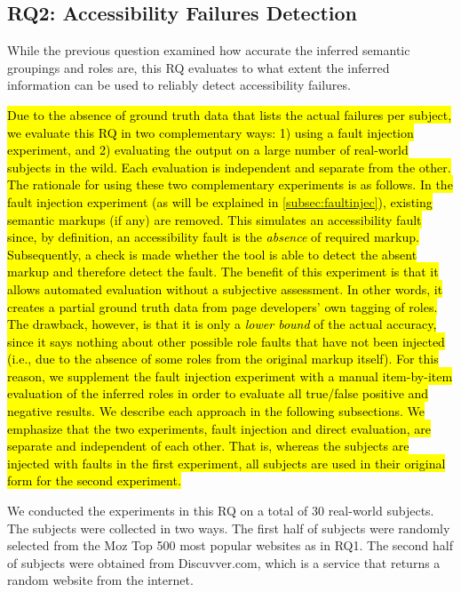 \subsection{RQ2: Accessibility Failures Detection}
While the previous question examined how accurate 
the inferred semantic groupings and roles are, 
this RQ evaluates to what extent the inferred information 
can be used to reliably detect accessibility failures.

\hl{Due to the absence of ground truth data that lists the 
actual failures per subject, 
we evaluate this RQ in two complementary ways: 
1) using a fault injection experiment, 
and 2) evaluating the output on a large number 
of real-world subjects in the wild. 
Each evaluation is independent and separate from the other. 
The rationale for using these two complementary experiments is as follows. 
In the fault injection experiment (as will be explained in \mbox{\cref{subsec:faultinjec}}), 
existing semantic markups (if any) 
are removed. This simulates an accessibility fault since, by definition, 
an accessibility fault is the \emph{absence} of required markup. 
Subsequently, a check is made whether the tool is able to detect the absent markup 
and therefore detect the fault. 
The benefit of this experiment is that it allows automated evaluation 
without a subjective assessment. In other words, it creates a partial 
ground truth data from page developers' own tagging of roles. 
The drawback, however, is that it is only a \emph{lower bound} 
of the actual accuracy, since it says nothing about other possible 
role faults that have not been injected 
(i.e., due to the absence of some roles from the original markup itself). 
For this reason, we supplement the fault injection experiment 
with a manual item-by-item evaluation of the inferred roles  
in order to evaluate all true/false positive and negative results.
We describe each approach in the following subsections. 
We emphasize that the two experiments, fault injection and direct evaluation, 
are separate and independent of each other. That is, whereas the subjects are injected with faults in the first experiment, all subjects are used in their original form 
for the second experiment. }



 We conducted the experiments in this RQ 
on a total of 30 real-world subjects. 
The subjects were collected in two ways. 
The first half of subjects were randomly selected 
from the Moz Top 500 most popular websites as in RQ1. 
The second half of subjects were obtained from Discuvver.com, 
which is a service that returns a random 
website from the internet.


